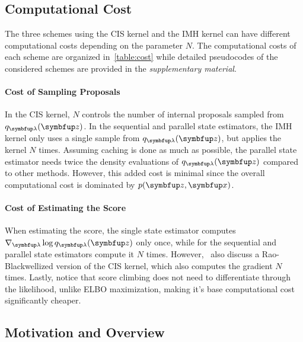 \vspace{-0.05in}
\subsection{Computational Cost}
\vspace{-0.05in}
The three schemes using the CIS kernel and the IMH kernel can have different computational costs depending on the parameter \(N\).
The computational costs of each scheme are organized in~\cref{table:cost} while detailed pseudocodes of the considered schemes are provided in the \textit{supplementary material}.

\vspace{-0.05in}
\paragraph{Cost of Sampling Proposals}
In the CIS kernel, \(N\) controls the number of internal proposals sampled from \(q_{\vlambda}(\vz)\).
In the sequential and parallel state estimators, the IMH kernel only uses a single sample from \(q_{\vlambda}(\vz)\), but applies the kernel \(N\) times.
Assuming caching is done as much as possible, the parallel state estimator needs twice the density evaluations of \(q_{\vlambda}(\vz)\) compared to other methods.
However, this added cost is minimal since the overall computational cost is dominated by  \(p(\vz,\vx)\).

\vspace{-0.05in}
\paragraph{Cost of Estimating the Score}
When estimating the score, the single state estimator computes \(\nabla_{\vlambda} \log q_{\vlambda}(\vz)\) only once, while for the sequential and parallel state estimators compute it \(N\) times.
However,~\cite{NEURIPS2020_b2070693} also discuss a Rao-Blackwellized version of the CIS kernel, which also computes the gradient \(N\) times.
Lastly, notice that score climbing does not need to differentiate through the likelihood, unlike ELBO maximization, making it's base computational cost significantly cheaper.

\vspace{-0.05in}
\subsection{Motivation and Overview}\label{section:motivation}
\vspace{-0.05in}
